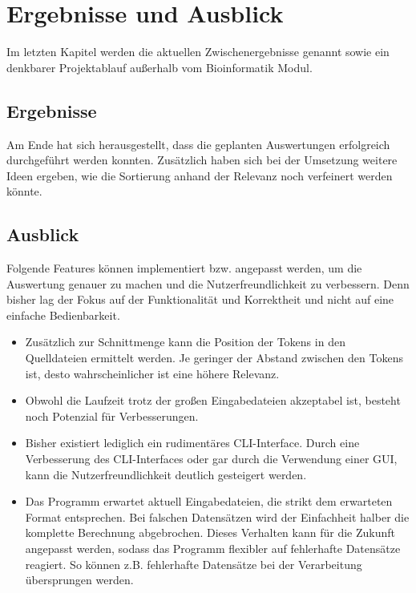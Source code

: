 \documentclass[a4paper,10pt]{article}
\begin{document}
\section{Ergebnisse und Ausblick}
    Im letzten Kapitel werden die aktuellen Zwischenergebnisse genannt sowie ein denkbarer Projektablauf außerhalb vom Bioinformatik Modul.

    \subsection{Ergebnisse}
        Am Ende hat sich herausgestellt, dass die geplanten Auswertungen erfolgreich durchgeführt werden konnten. Zusätzlich haben sich bei der Umsetzung weitere Ideen ergeben, wie die Sortierung anhand der Relevanz noch verfeinert werden könnte.

    \subsection{Ausblick}
        Folgende Features können implementiert bzw. angepasst werden, um die Auswertung genauer zu machen und die Nutzerfreundlichkeit zu verbessern. Denn bisher lag der Fokus auf der Funktionalität und Korrektheit und nicht auf eine einfache Bedienbarkeit.
        \begin{itemize}
            \item Zusätzlich zur Schnittmenge kann die Position der Tokens in den Quelldateien ermittelt werden. Je geringer der Abstand zwischen den Tokens ist, desto wahrscheinlicher ist eine höhere Relevanz.
            \item Obwohl die Laufzeit trotz der großen Eingabedateien akzeptabel ist, besteht noch Potenzial für Verbesserungen.
            \item Bisher existiert lediglich ein rudimentäres CLI-Interface. Durch eine Verbesserung des CLI-Interfaces oder gar durch die Verwendung einer GUI, kann die Nutzerfreundlichkeit deutlich gesteigert werden.
            \item Das Programm erwartet aktuell Eingabedateien, die strikt dem erwarteten Format entsprechen. Bei falschen Datensätzen wird der Einfachheit halber die komplette Berechnung abgebrochen. Dieses Verhalten kann für die Zukunft angepasst werden, sodass das Programm flexibler auf fehlerhafte Datensätze reagiert. So können z.B. fehlerhafte Datensätze bei der Verarbeitung übersprungen werden.
        \end{itemize}
\end{document}
